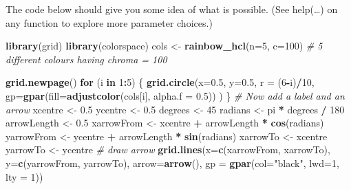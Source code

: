 \documentclass[9pt,letter]{article}
\newenvironment{Shaded}{\begin{snugshade}}{\end{snugshade}}
\newcommand{\KeywordTok}[1]{\textcolor[rgb]{0.13,0.29,0.53}{\textbf{#1}}}
\newcommand{\DataTypeTok}[1]{\textcolor[rgb]{0.13,0.29,0.53}{#1}}
\newcommand{\DecValTok}[1]{\textcolor[rgb]{0.00,0.00,0.81}{#1}}
\newcommand{\FloatTok}[1]{\textcolor[rgb]{0.00,0.00,0.81}{#1}}
\newcommand{\StringTok}[1]{\textcolor[rgb]{0.31,0.60,0.02}{#1}}
\newcommand{\CommentTok}[1]{\textcolor[rgb]{0.56,0.35,0.01}{\textit{#1}}}
\newcommand{\ControlFlowTok}[1]{\textcolor[rgb]{0.13,0.29,0.53}{\textbf{#1}}}
\newcommand{\OperatorTok}[1]{\textcolor[rgb]{0.81,0.36,0.00}{\textbf{#1}}}
\newcommand{\NormalTok}[1]{#1}
\begin{document}
The code below should give you some idea of what is possible. (See
help(\ldots{}) on any function to explore more parameter choices.)

\begin{Shaded}
\begin{Highlighting}[]
\KeywordTok{library}\NormalTok{(grid)}
\KeywordTok{library}\NormalTok{(colorspace)}
\NormalTok{cols <-}\StringTok{ }\KeywordTok{rainbow_hcl}\NormalTok{(}\DataTypeTok{n=}\DecValTok{5}\NormalTok{, }\DataTypeTok{c=}\DecValTok{100}\NormalTok{)  }\CommentTok{# 5 different colours having chroma = 100}

\KeywordTok{grid.newpage}\NormalTok{()}
\ControlFlowTok{for}\NormalTok{ (i }\ControlFlowTok{in} \DecValTok{1}\OperatorTok{:}\DecValTok{5}\NormalTok{) \{}
  \KeywordTok{grid.circle}\NormalTok{(}\DataTypeTok{x=}\FloatTok{0.5}\NormalTok{,}
              \DataTypeTok{y=}\FloatTok{0.5}\NormalTok{,}
              \DataTypeTok{r =}\NormalTok{ (}\DecValTok{6}\OperatorTok{-}\NormalTok{i)}\OperatorTok{/}\DecValTok{10}\NormalTok{,}
              \DataTypeTok{gp=}\KeywordTok{gpar}\NormalTok{(}\DataTypeTok{fill=}\KeywordTok{adjustcolor}\NormalTok{(cols[i], }\DataTypeTok{alpha.f =} \FloatTok{0.5}\NormalTok{))}
\NormalTok{  )}
\NormalTok{\}}
\CommentTok{# Now add a label and an arrow}
\NormalTok{xcentre <-}\StringTok{ }\FloatTok{0.5}
\NormalTok{ycentre <-}\StringTok{ }\FloatTok{0.5}
\NormalTok{degrees <-}\StringTok{ }\DecValTok{45}
\NormalTok{radians <-}\StringTok{ }\NormalTok{pi }\OperatorTok{*}\StringTok{ }\NormalTok{degrees }\OperatorTok{/}\StringTok{ }\DecValTok{180}
\NormalTok{arrowLength <-}\StringTok{ }\FloatTok{0.5} 
\NormalTok{xarrowFrom <-}\StringTok{ }\NormalTok{xcentre }\OperatorTok{+}\StringTok{ }\NormalTok{arrowLength }\OperatorTok{*}\StringTok{ }\KeywordTok{cos}\NormalTok{(radians)}
\NormalTok{yarrowFrom <-}\StringTok{ }\NormalTok{ycentre }\OperatorTok{+}\StringTok{ }\NormalTok{arrowLength }\OperatorTok{*}\StringTok{ }\KeywordTok{sin}\NormalTok{(radians)}
\NormalTok{xarrowTo <-}\StringTok{ }\NormalTok{xcentre }
\NormalTok{yarrowTo <-}\StringTok{ }\NormalTok{ycentre}
\CommentTok{# draw arrow}
\KeywordTok{grid.lines}\NormalTok{(}\DataTypeTok{x=}\KeywordTok{c}\NormalTok{(xarrowFrom, xarrowTo), }\DataTypeTok{y=}\KeywordTok{c}\NormalTok{(yarrowFrom, yarrowTo), }
           \DataTypeTok{arrow=}\KeywordTok{arrow}\NormalTok{(),}
           \DataTypeTok{gp =} \KeywordTok{gpar}\NormalTok{(}\DataTypeTok{col=}\StringTok{"black"}\NormalTok{, }\DataTypeTok{lwd=}\DecValTok{1}\NormalTok{, }\DataTypeTok{lty =} \DecValTok{1}\NormalTok{))}


\end{Highlighting}
\end{Shaded}
\end{document}

